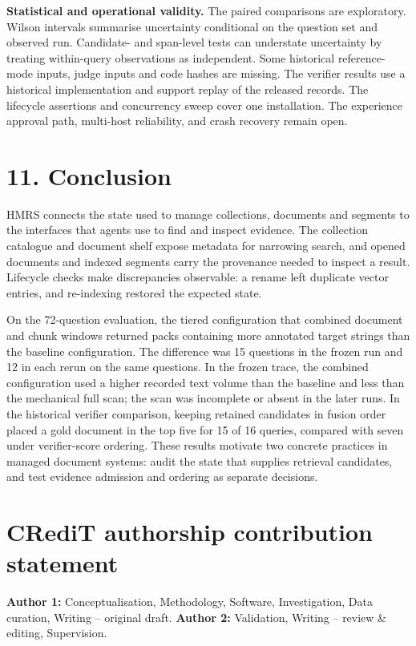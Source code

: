 \noindent\textbf{Statistical and operational validity.} The paired
comparisons are exploratory. Wilson intervals summarise uncertainty
conditional on the question set and observed run. Candidate- and span-level
tests can understate uncertainty by treating within-query observations as
independent. Some historical reference-mode inputs, judge inputs and code
hashes are missing. The verifier results use a historical implementation
and support replay of the released records. The lifecycle assertions and
concurrency sweep cover one installation. The experience approval path,
multi-host reliability, and crash recovery remain open.


\section{11. Conclusion}


HMRS connects the state used to manage collections, documents and segments
to the interfaces that agents use to find and inspect evidence. The
collection catalogue and document shelf expose metadata for narrowing
search, and opened documents and indexed segments carry the provenance
needed to inspect a result. Lifecycle checks make discrepancies observable:
a rename left duplicate vector entries, and re-indexing restored the expected
state.

On the 72-question evaluation, the tiered configuration that combined
document and chunk windows returned packs containing more annotated target
strings than the baseline configuration. The difference was 15 questions in the
frozen run and 12 in each rerun on the same questions.
In the frozen trace, the combined configuration used a higher recorded text
volume than the baseline and less than the mechanical full scan; the scan was
incomplete or absent in the later runs. In the historical verifier
comparison, keeping retained candidates in fusion order placed a gold
document in the top five for 15 of 16 queries, compared with seven under
verifier-score ordering.
These results motivate two concrete practices in managed document systems:
audit the state that supplies retrieval candidates, and test evidence
admission and ordering as separate decisions.



\section*{CRediT authorship contribution statement}
\textbf{Author 1:} Conceptualisation, Methodology, Software, Investigation,
Data curation, Writing -- original draft. \textbf{Author 2:} Validation,
Writing -- review \& editing, Supervision. 
